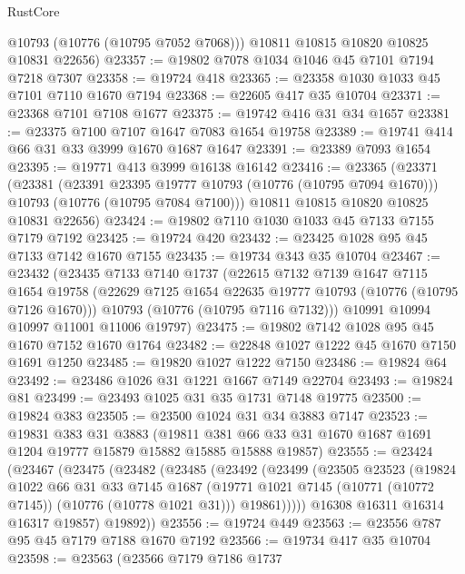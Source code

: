 \begin{lexlean}{RustCore}
\begin{coremodule}
        @10793
        (@10776 (@10795 @7052 @7068)))
      @10811
      @10815
      @10820
      @10825
      @10831
      @22656)
@23357 := @19802 @7078 @1034 @1046 @45 @7101 @7194 @7218 @7307
@23358 := @19724 @418
@23365 := @23358 @1030 @1033 @45 @7101 @7110 @1670 @7194
@23368 := @22605 @417 @35 @10704
@23371 := @23368 @7101 @7108 @1677
@23375 := @19742 @416 @31 @34 @1657
@23381 := @23375 @7100 @7107 @1647 @7083 @1654 @19758
@23389 := @19741 @414 @66 @31 @33 @3999 @1670 @1687 @1647
@23391 := @23389 @7093 @1654
@23395 := @19771 @413 @3999 @16138 @16142
@23416 := @23365
    (@23371
      (@23381
        (@23391 @23395 @19777 @10793 (@10776 (@10795 @7094 @1670)))
        @10793
        (@10776 (@10795 @7084 @7100)))
      @10811
      @10815
      @10820
      @10825
      @10831
      @22656)
@23424 := @19802 @7110 @1030 @1033 @45 @7133 @7155 @7179 @7192
@23425 := @19724 @420
@23432 := @23425 @1028 @95 @45 @7133 @7142 @1670 @7155
@23435 := @19734 @343 @35 @10704
@23467 := @23432
    (@23435
      @7133
      @7140
      @1737
      (@22615
        @7132
        @7139
        @1647
        @7115
        @1654
        @19758
        (@22629 @7125 @1654 @22635 @19777 @10793 (@10776 (@10795 @7126 @1670)))
        @10793
        (@10776 (@10795 @7116 @7132)))
      @10991
      @10994
      @10997
      @11001
      @11006
      @19797)
@23475 := @19802 @7142 @1028 @95 @45 @1670 @7152 @1670 @1764
@23482 := @22848 @1027 @1222 @45 @1670 @7150 @1691 @1250
@23485 := @19820 @1027 @1222 @7150
@23486 := @19824 @64
@23492 := @23486 @1026 @31 @1221 @1667 @7149 @22704
@23493 := @19824 @81
@23499 := @23493 @1025 @31 @35 @1731 @7148 @19775
@23500 := @19824 @383
@23505 := @23500 @1024 @31 @34 @3883 @7147
@23523 := @19831
    @383
    @31
    @3883
    (@19811 @381 @66 @33 @31 @1670 @1687 @1691 @1204 @19777 @15879 @15882 @15885 @15888 @19857)
@23555 := @23424
    (@23467
      (@23475
        (@23482
          (@23485
            (@23492
              (@23499
                (@23505
                  @23523
                  (@19824
                    @1022
                    @66
                    @31
                    @33
                    @7145
                    @1687
                    (@19771 @1021 @7145 (@10771 (@10772 @7145)) (@10776 (@10778 @1021 @31)))
                    @19861)))))
          @16308
          @16311
          @16314
          @16317
          @19857)
        @19892))
@23556 := @19724 @449
@23563 := @23556 @787 @95 @45 @7179 @7188 @1670 @7192
@23566 := @19734 @417 @35 @10704
@23598 := @23563
    (@23566
      @7179
      @7186
      @1737

\end{coremodule}
\end{lexlean}
